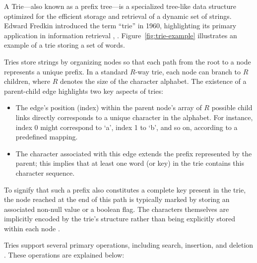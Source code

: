 A Trie---also known as a prefix tree---is a specialized tree-like data structure optimized for the efficient storage and retrieval of a dynamic set of strings. Edward Fredkin introduced the term ``trie'' in 1960, highlighting its primary application in information retrieval \cite{Fredkin1960}, \cite{Knuth1998}. Figure~\ref{fig:trie-example} illustrates an example of a trie storing a set of words.

Tries store strings by organizing nodes so that each path from the root to a node represents a unique prefix. In a standard $R$-way trie, each node can branch to $R$ children, where $R$ denotes the size of the character alphabet. The existence of a parent-child edge highlights two key aspects of tries:
\begin{itemize}
    \item The edge's position (index) within the parent node's array of $R$ possible child links directly corresponds to a unique character in the alphabet. For instance, index 0 might correspond to `a', index 1 to `b', and so on, according to a predefined mapping.
    \item The character associated with this edge extends the prefix represented by the parent; this implies that at least one word (or key) in the trie contains this character sequence.
\end{itemize}
To signify that such a prefix also constitutes a complete key present in the trie, the node reached at the end of this path is typically marked by storing an associated non-null value or a boolean flag. The characters themselves are implicitly encoded by the trie's structure rather than being explicitly stored within each node \cite{SedgewickWayne2011}.


Tries support several primary operations, including search, insertion, and deletion \cite{SedgewickWayne2011}. These operations are explained below:

